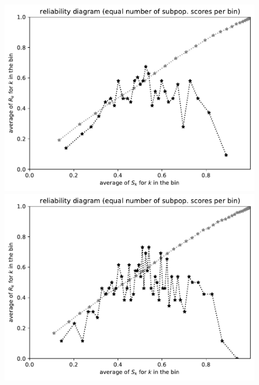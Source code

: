 \documentclass{article}
\begin{document}
\begin{figure}
\begin{centering}
\parbox{\imsize}{\includegraphics[width=\imsize]
{./codes/unweighted/prob-1-68-sidewinder-horned-rattlesnake-Crotalus-cerastesequisamps30}}
\quad\quad
\parbox{\imsize}{\includegraphics[width=\imsize]
{./codes/unweighted/prob-1-68-sidewinder-horned-rattlesnake-Crotalus-cerastesequisamps50}}

\vspace{\vertsep}


\end{centering}
\end{figure}
\end{document}
